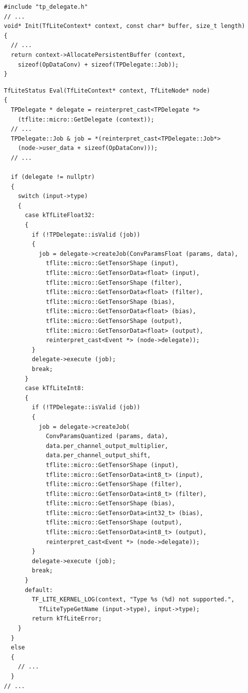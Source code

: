 \begin{verbatim}
#include "tp_delegate.h"
// ...
void* Init(TfLiteContext* context, const char* buffer, size_t length)
{
  // ...
  return context->AllocatePersistentBuffer (context, 
    sizeof(OpDataConv) + sizeof(TPDelegate::Job));
}
\end{verbatim}

\begin{verbatim}
TfLiteStatus Eval(TfLiteContext* context, TfLiteNode* node)
{
  TPDelegate * delegate = reinterpret_cast<TPDelegate *>
    (tflite::micro::GetDelegate (context));
  // ...
  TPDelegate::Job & job = *(reinterpret_cast<TPDelegate::Job*>
    (node->user_data + sizeof(OpDataConv)));
  // ...
  
  if (delegate != nullptr)
  {
    switch (input->type)
    {
      case kTfLiteFloat32:
      {
        if (!TPDelegate::isValid (job))
        {
          job = delegate->createJob(ConvParamsFloat (params, data),
            tflite::micro::GetTensorShape (input),
            tflite::micro::GetTensorData<float> (input),
            tflite::micro::GetTensorShape (filter),
            tflite::micro::GetTensorData<float> (filter),
            tflite::micro::GetTensorShape (bias),
            tflite::micro::GetTensorData<float> (bias),
            tflite::micro::GetTensorShape (output),
            tflite::micro::GetTensorData<float> (output),
            reinterpret_cast<Event *> (node->delegate));
        }
        delegate->execute (job);
        break;
      }
      case kTfLiteInt8:
      {
        if (!TPDelegate::isValid (job))
        {
          job = delegate->createJob(
            ConvParamsQuantized (params, data),
            data.per_channel_output_multiplier,
            data.per_channel_output_shift,
            tflite::micro::GetTensorShape (input),
            tflite::micro::GetTensorData<int8_t> (input),
            tflite::micro::GetTensorShape (filter),
            tflite::micro::GetTensorData<int8_t> (filter),
            tflite::micro::GetTensorShape (bias),
            tflite::micro::GetTensorData<int32_t> (bias),
            tflite::micro::GetTensorShape (output),
            tflite::micro::GetTensorData<int8_t> (output),
            reinterpret_cast<Event *> (node->delegate));
        }
        delegate->execute (job);
        break;
      }
      default:
        TF_LITE_KERNEL_LOG(context, "Type %s (%d) not supported.",
          TfLiteTypeGetName (input->type), input->type);
        return kTfLiteError;
    }
  }
  else
  {
    // ...
  }
// ...
\end{verbatim}


